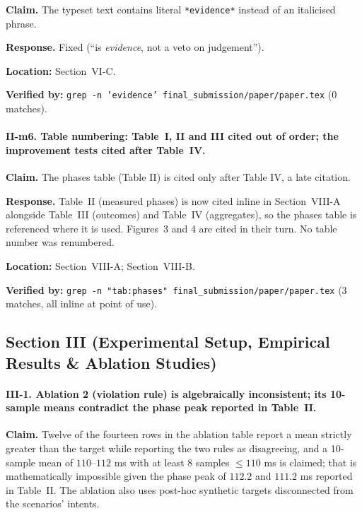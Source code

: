 \documentclass[11pt,a4paper]{article}
\begin{document}
\textbf{Claim.} The typeset text contains literal \texttt{*evidence*} instead
of an italicised phrase.

\textbf{Response.} Fixed (``is \emph{evidence}, not a veto on judgement'').

\textbf{Location:} Section~VI-C.

\textbf{Verified by:} \texttt{grep -n '\*evidence\*' final\_submission/paper/paper.tex}
(0 matches).

\paragraph{II-m6. Table numbering: Table~I, II and III cited out of order; the
improvement tests cited after Table~IV.}

\textbf{Claim.} The phases table (Table II) is cited only after Table IV, a
late citation.

\textbf{Response.} Table~II (measured phases) is now cited inline in
Section~VIII-A alongside Table~III (outcomes) and Table~IV (aggregates), so
the phases table is referenced where it is used. Figures~3 and 4 are cited in
their turn. No table number was renumbered.

\textbf{Location:} Section~VIII-A; Section~VIII-B.

\textbf{Verified by:} \texttt{grep -n "tab:phases" final\_submission/paper/paper.tex}
(3 matches, all inline at point of use).

\subsection{Section III (Experimental Setup, Empirical Results \& Ablation Studies)}

\paragraph{III-1. Ablation 2 (violation rule) is algebraically inconsistent;
its 10-sample means contradict the phase peak reported in Table~II.}

\textbf{Claim.} Twelve of the fourteen rows in the ablation table report a
mean strictly greater than the target while reporting the two rules as
disagreeing, and a 10-sample mean of $110$--$112$ ms with at least 8 samples
$\le 110$ ms is claimed; that is mathematically impossible given the phase
peak of $112.2$ and $111.2$ ms reported in Table~II. The ablation also uses
post-hoc synthetic targets disconnected from the scenarios' intents.
\end{document}

